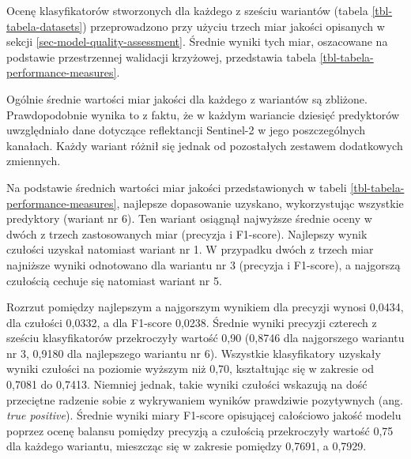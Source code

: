 \documentclass{amuthesis}
\begin{document}
Ocenę klasyfikatorów stworzonych dla każdego z sześciu wariantów (tabela
\ref{tbl-tabela-datasets}) przeprowadzono przy użyciu trzech miar
jakości opisanych w sekcji \ref{sec-model-quality-assessment}. Średnie
wyniki tych miar, oszacowane na podstawie przestrzennej walidacji
krzyżowej, przedstawia tabela \ref{tbl-tabela-performance-measures}.

Ogólnie średnie wartości miar jakości dla każdego z wariantów są
zbliżone. Prawdopodobnie wynika to z faktu, że w każdym wariancie
dziesięć predyktorów uwzględniało dane dotyczące reflektancji Sentinel-2
w jego poszczególnych kanałach. Każdy wariant różnił się jednak od
pozostałych zestawem dodatkowych zmiennych.

Na podstawie średnich wartości miar jakości przedstawionych w tabeli
\ref{tbl-tabela-performance-measures}, najlepsze dopasowanie uzyskano,
wykorzystując wszystkie predyktory (wariant nr 6). Ten wariant osiągnął
najwyższe średnie oceny w dwóch z trzech zastosowanych miar (precyzja i
F1-score). Najlepszy wynik czułości uzyskał natomiast wariant nr 1. W
przypadku dwóch z trzech miar najniższe wyniki odnotowano dla wariantu
nr 3 (precyzja i F1-score), a najgorszą czułością cechuje się natomiast
wariant nr 5.

Rozrzut pomiędzy najlepszym a najgorszym wynikiem dla precyzji wynosi
0,0434, dla czułości 0,0332, a dla F1-score 0,0238. Średnie wyniki
precyzji czterech z sześciu klasyfikatorów przekroczyły wartość 0,90
(0,8746 dla najgorszego wariantu nr 3, 0,9180 dla najlepszego wariantu
nr 6). Wszystkie klasyfikatory uzyskały wyniki czułości na poziomie
wyższym niż 0,70, kształtując się w zakresie od 0,7081 do 0,7413.
Niemniej jednak, takie wyniki czułości wskazują na dość przeciętne
radzenie sobie z wykrywaniem wyników prawdziwie pozytywnych (ang.
\emph{true positive}). Średnie wyniki miary F1-score opisującej
całościowo jakość modelu poprzez ocenę balansu pomiędzy precyzją a
czułością przekroczyły wartość 0,75 dla każdego wariantu, mieszcząc się
w zakresie pomiędzy 0,7691, a 0,7929.
\end{document}
